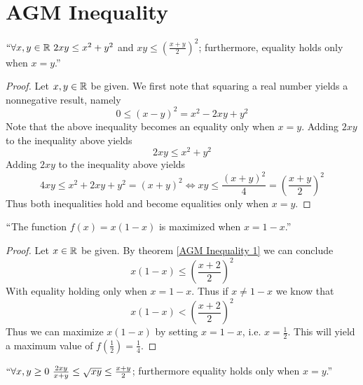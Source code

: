     \section{AGM Inequality}
        \begin{theorem}
            \label{AGM Inequality 1}
            $``\forall x, y \in \mathbb{R} \ 2xy \le x^2 + y^2$ and $xy \le \left(\frac{x + y}{2}\right)^2$;
            furthermore, equality holds only when $x = y$.''
        \end{theorem}
        \begin{proof}
            Let $x, y \in \mathbb{R}$ be given. We first note that squaring a real number
            yields a nonnegative result, namely
            \[
                0 \le (x - y)^2 = x^2 - 2xy + y^2
            \]
            Note that the above inequality becomes an equality only when $x = y$.
            Adding $2xy$ to the inequality above yields
            \begin{equation}
                2xy \le x^2 + y^2
            \end{equation}
            Adding $2xy$ to the inequality above yields
            \begin{equation}
                4xy \le x^2 + 2xy + y^2 = (x + y)^2 \iff xy \le \frac{(x + y)^2}{4}
                                        = \left(\frac{x + y}{2}\right)^2
            \end{equation}
            Thus both inequalities hold and become equalities only when $x = y$. \QED
        \end{proof}
        \begin{corollary}
            $``$The function $f(x) = x(1 - x)$ is maximized when $x = 1 - x$.''
        \end{corollary}
        \begin{proof}
            Let $x \in \mathbb{R}$ be given. By theorem \ref{AGM Inequality 1} we can conclude
            \[
                x(1 - x) \le \left(\frac{x + 2}{2}\right)^2
            \]
            With equality holding only when $x = 1 - x$. Thus if $x \neq 1 - x$ we know that
            \[
                x(1 - x) <  \left(\frac{x + 2}{2}\right)^2
            \]
            Thus we can maximize $x(1 - x)$ by setting $x = 1 - x$, i.e. $x = \frac{1}{2}$.
            This will yield a maximum value of $f(\frac{1}{2}) = \frac{1}{4}$. \QED
        \end{proof}
        \begin{theorem}
            $``\forall x, y \ge 0 \ \frac{2xy}{x + y} \le \sqrt{xy} \le \frac{x + y}{2}$;
            furthermore equality holds only when $x = y$.''
        \end{theorem}
